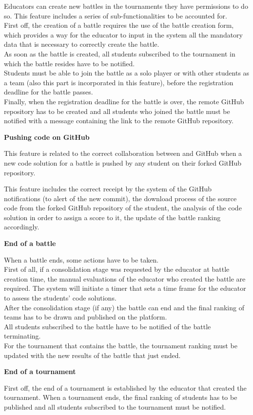 Educators can create new battles in the tournaments they have permissions to do so. This feature includes a series of sub-functionalities to be accounted for.\\
First off, the creation of a battle requires the use of the battle creation form, which provides a way for the educator to input in the system all the mandatory data that is necessary to correctly create the battle. \\
As soon as the battle is created, all students subscribed to the tournament in which the battle resides have to be notified.\\
Students must be able to join the battle as a solo player or with other students as a team (also this part is incorporated in this feature), before the registration deadline for the battle passes.\\
Finally, when the registration deadline for the battle is over, the remote GitHub repository has to be created and all students who joined the battle must be notified with a message containing the link to the remote GitHub repository.

\vspace{0.5cm}

\textbf{Pushing code on GitHub}

This feature is related to the correct collaboration between \app and GitHub when a new code solution for a battle is pushed by any student on their forked GitHub repository.

This feature includes the correct receipt by the system of the GitHub notifications (to alert \app of the new commit), the download process of the source code from the forked GitHub repository of the student, the analysis of the code solution in order to assign a score to it, the update of the battle ranking accordingly.

\vspace{0.5cm}

\textbf{End of a battle}

When a battle ends, some actions have to be taken. \\
First of all, if a consolidation stage was requested by the educator at battle creation time, the manual evaluations of the educator who created the battle are required. The \app system will initiate a timer that sets a time frame for the educator to assess the students' code solutions.\\
After the consolidation stage (if any) the battle can end and the final ranking of teams has to be drawn and published on the platform.\\
All students subscribed to the battle have to be notified of the battle terminating.\\
For the tournament that contains the battle, the tournament ranking must be updated with the new results of the battle that just ended.

\vspace{0.5cm}

\textbf{End of a tournament}

First off, the end of a tournament is established by the educator that created the tournament. When a tournament ends, the final ranking of students has to be published and all students subscribed to the tournament must be notified.







